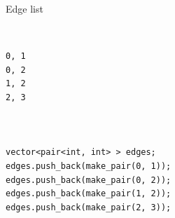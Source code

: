 \documentclass[10pt]{beamer}
\begin{document}
\begin{frame}[fragile]{Edge list}

    \begin{columns}[T]
        \begin{column}{.4\textwidth}
            \begin{verbatim}

0, 1
0, 2
1, 2
2, 3



vector<pair<int, int> > edges;
edges.push_back(make_pair(0, 1));
edges.push_back(make_pair(0, 2));
edges.push_back(make_pair(1, 2));
edges.push_back(make_pair(2, 3));
            \end{verbatim}
        \end{column}%
        \hfill%
        \begin{column}{.4\textwidth}
            \begin{figure}
            \end{figure}
        \end{column}%
    \end{columns}
\end{frame}
\end{document}
